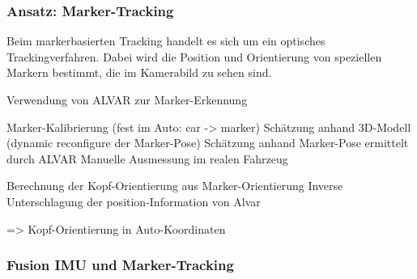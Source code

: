 \subsubsection{Ansatz: Marker-Tracking}
Beim markerbasierten Tracking handelt es sich um ein optisches Trackingverfahren. Dabei wird die Position und Orientierung von speziellen Markern bestimmt, die im Kamerabild zu sehen sind.

Verwendung von ALVAR zur Marker-Erkennung

Marker-Kalibrierung (fest im Auto: car -> marker)
Schätzung anhand 3D-Modell (dynamic reconfigure der Marker-Pose)
Schätzung anhand Marker-Pose ermittelt durch ALVAR
Manuelle Ausmessung im realen Fahrzeug

Berechnung der Kopf-Orientierung aus Marker-Orientierung
Inverse
Unterschlagung der position-Information von Alvar

=> Kopf-Orientierung in Auto-Koordinaten



\subsubsection{Fusion IMU und Marker-Tracking}
